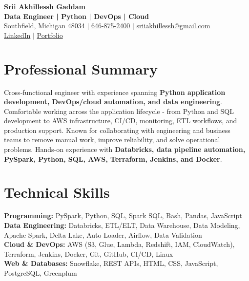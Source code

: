 \documentclass[letterpaper,10pt]{article}
\begin{document}
\fontsize{9.35pt}{10.45pt}\selectfont

\begin{center}
    {\LARGE \textbf{Srii Akhillessh Gaddam}} \\[-1pt]
    \textbf{Data Engineer | Python | DevOps | Cloud} \\[2pt]
    Southfield, Michigan 48034 $|$
    \href{tel:6468752400}{646-875-2400} $|$
    \href{mailto:sriiakhillessh@gmail.com}{sriiakhillessh@gmail.com} \\[1pt]
    \href{https://www.linkedin.com/in/srii-akhiilessh-gaddam-b48668191/}{LinkedIn} $|$
    \href{https://sriiakhillesshg.github.io/portfolio/}{Portfolio}
\end{center}
\vspace{-8pt}

\section{Professional Summary}
\small{Cross-functional engineer with experience spanning \textbf{Python application development, DevOps/cloud automation, and data engineering}. Comfortable working across the application lifecycle - from Python and SQL development to AWS infrastructure, CI/CD, monitoring, ETL workflows, and production support. Known for collaborating with engineering and business teams to remove manual work, improve reliability, and solve operational problems. Hands-on experience with \textbf{Databricks, data pipeline automation, PySpark, Python, SQL, AWS, Terraform, Jenkins, and Docker}.}

\section{Technical Skills}
\small{
\textbf{Programming:} PySpark, Python, SQL, Spark SQL, Bash, Pandas, JavaScript \\
\textbf{Data Engineering:} Databricks, ETL/ELT, Data Warehouse, Data Modeling, Apache Spark, Delta Lake, Auto Loader, Airflow, Data Validation \\
\textbf{Cloud \& DevOps:} AWS (S3, Glue, Lambda, Redshift, IAM, CloudWatch), Terraform, Jenkins, Docker, Git, GitHub, CI/CD, Linux \\
\textbf{Web \& Databases:} Snowflake, REST APIs, HTML, CSS, JavaScript, PostgreSQL, Greenplum
}
\end{document}

